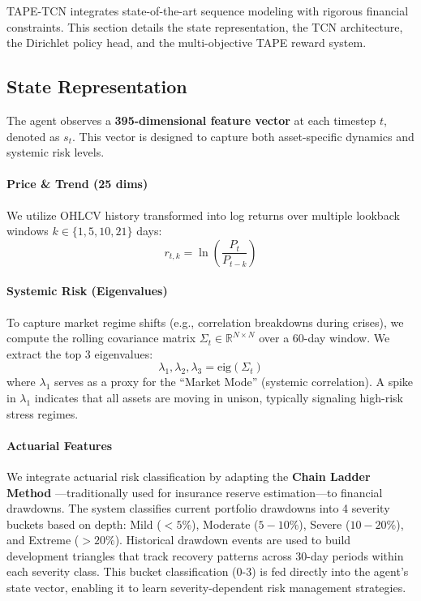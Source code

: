 TAPE-TCN integrates state-of-the-art sequence modeling with rigorous financial constraints. This section details the state representation, the TCN architecture, the Dirichlet policy head, and the multi-objective TAPE reward system.

\subsection{State Representation}

The agent observes a \textbf{395-dimensional feature vector} at each timestep $t$, denoted as $s_t$. This vector is designed to capture both asset-specific dynamics and systemic risk levels.

\paragraph{Price \& Trend (25 dims)} 
We utilize OHLCV history transformed into log returns over multiple lookback windows $k \in \{1, 5, 10, 21\}$ days:
\begin{equation}
    r_{t,k} = \ln\left(\frac{P_t}{P_{t-k}}\right)
\end{equation}

\paragraph{Systemic Risk (Eigenvalues)}
To capture market regime shifts (e.g., correlation breakdowns during crises), we compute the rolling covariance matrix $\Sigma_t \in \mathbb{R}^{N \times N}$ over a 60-day window. We extract the top 3 eigenvalues:
\begin{equation}
    \lambda_1, \lambda_2, \lambda_3 = \text{eig}(\Sigma_t)
\end{equation}
where $\lambda_1$ serves as a proxy for the ``Market Mode'' (systemic correlation). A spike in $\lambda_1$ indicates that all assets are moving in unison, typically signaling high-risk stress regimes.

\paragraph{Actuarial Features}
We integrate actuarial risk classification by adapting the \textbf{Chain Ladder Method} \citep{mack1993distribution,taylor2000loss}—traditionally used for insurance reserve estimation—to financial drawdowns. 
The system classifies current portfolio drawdowns into 4 severity buckets based on depth: Mild ($<5\%$), Moderate ($5-10\%$), Severe ($10-20\%$), and Extreme ($>20\%$). 
Historical drawdown events are used to build development triangles that track recovery patterns across 30-day periods within each severity class.
This bucket classification (0-3) is fed directly into the agent's state vector, enabling it to learn severity-dependent risk management strategies.

